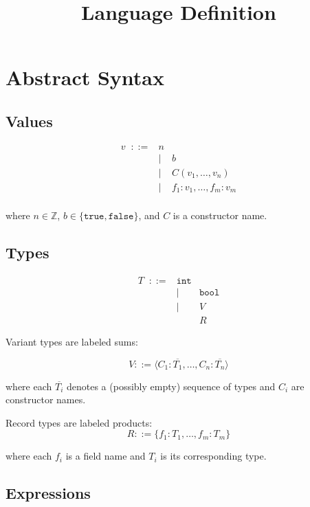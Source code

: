 \documentclass[11pt]{article}
\title{Language Definition}
\author{}
\date{}
\begin{document}
\maketitle

\section{Abstract Syntax}

\subsection{Values}
\[
\begin{array}{rcl}
v \;\;::=& n \\
        &|& b \\
        &|& C(v_1,\dots,v_n) \\
        &|& {f_1: v_1, \dots, f_m: v_m} \\
\end{array}
\]

where $n \in \mathbb{Z}$, $b \in \{\texttt{true}, \texttt{false}\}$, and $C$ is a constructor name.

\subsection{Types}

\[
\begin{array}{rcl}
T \;\;::=& \texttt{int} \\
        &|& \texttt{bool} \\
        &|& V \\ 
        && R
\end{array}
\]


Variant types are labeled sums:

\[
V ::= \langle C_1 : \overline{T_1}, \dots, C_n : \overline{T_n} \rangle
\]

where each $\overline{T_i}$ denotes a (possibly empty) sequence of types and $C_i$ are
constructor names.

Record types are labeled products:
\[
R ::= \{ f_1 : T_1, \dots, f_m : T_m \}
\]

where each $f_i$ is a field name and $T_i$ is its corresponding type.

\subsection{Expressions}
\end{document}
